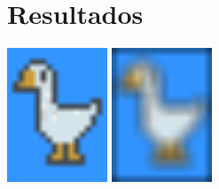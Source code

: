 \documentclass[a4paper, 11pt]{article}
\begin{document}
\section*{Resultados}
\begin{center}
    \includegraphics[height=4cm]{figures/goose.png} \raisebox{2cm}{$\to$} \includegraphics[height=4cm]{figures/goose_blur.png}
\end{center}
\end{document}
